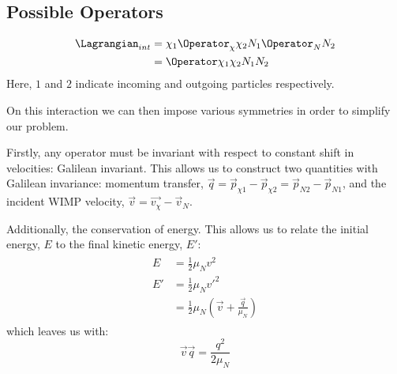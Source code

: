 \subsection{Possible Operators}
\par

\begin{align}
\begin{split}
    \Lagrangian_{int} &= \chi_{1} \Operator_{\chi} \chi_{2} N_{1} \Operator_{N} N_{2} \\
                      &= \Operator \chi_{1}\chi_{2} N_{1}N_{2}
\end{split}
\end{align}
Here, $1$ and $2$ indicate incoming and outgoing particles respectively.

\par
On this interaction we can then impose various symmetries in order to simplify our problem.

\par
Firstly, any operator must be invariant with respect to constant shift in velocities: Galilean invariant.
This allows us to construct two quantities with Galilean invariance: momentum transfer, $\vec{q} = \vec{p}_{\chi 1} - \vec{p}_{\chi 2} = \vec{p}_{N 2} - \vec{p}_{N 1}$, and the incident WIMP velocity, $\vec{v}=\vec{v_\chi} - \vec{v}_N$.

\par
Additionally, the conservation of energy.
This allows us to relate the initial energy, $E$ to the final kinetic energy, $E'$:
\begin{align}
\begin{split}
    E  &= \frac{1}{2}\mu_N v^2 \\
    E' &= \frac{1}{2}\mu_N v'^2 \\
       &= \frac{1}{2}\mu_N (\vec{v} + \frac{\vec{q}}{\mu_N})
\end{split}
\end{align}
which leaves us with:
\begin{equation}
    \vec{v}\vec{q} = \frac{q^2}{2\mu_N}
\end{equation}

